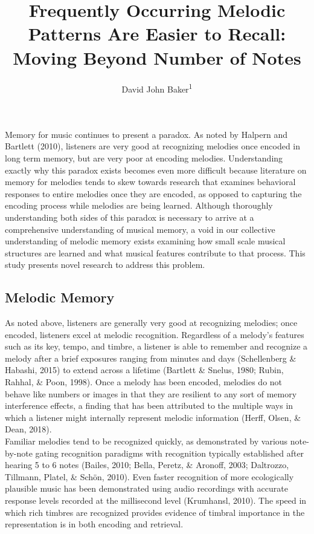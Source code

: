 \documentclass[english,man]{apa6}
\title{Frequently Occurring Melodic Patterns Are Easier to Recall: Moving Beyond Number of Notes}
\author{David John Baker\textsuperscript{1}}
\date{}
\affiliation{\vspace{0.5cm}\textsuperscript{1} Department of Computing, Goldsmiths, University of London}
\begin{document}
\maketitle

Memory for music continues to present a paradox.
As noted by Halpern and Bartlett (2010), listeners are very good at recognizing melodies once encoded in long term memory, but are very poor at encoding melodies.
Understanding exactly why this paradox exists becomes even more difficult because literature on memory for melodies tends to skew towards research that examines behavioral responses to entire melodies once they are encoded, as opposed to capturing the encoding process while melodies are being learned.
Although thoroughly understanding both sides of this paradox is necessary to arrive at a comprehensive understanding of musical memory, a void in our collective understanding of melodic memory exists examining how small scale musical structures are learned and what musical features contribute to that process.
This study presents novel research to address this problem.

\hypertarget{melodic-memory}{%
\subsection{Melodic Memory}\label{melodic-memory}}

As noted above, listeners are generally very good at recognizing melodies; once encoded, listeners excel at melodic recognition.
Regardless of a melody's features such as its key, tempo, and timbre, a listener is able to remember and recognize a melody after a brief exposures ranging from minutes and days (Schellenberg \& Habashi, 2015) to extend across a lifetime (Bartlett \& Snelus, 1980; Rubin, Rahhal, \& Poon, 1998).
Once a melody has been encoded, melodies do not behave like numbers or images in that they are resilient to any sort of memory interference effects, a finding that has been attributed to the multiple ways in which a listener might internally represent melodic information (Herff, Olsen, \& Dean, 2018).\\
Familiar melodies tend to be recognized quickly, as demonstrated by various note-by-note gating recognition paradigms with recognition typically established after hearing 5 to 6 notes (Bailes, 2010; Bella, Peretz, \& Aronoff, 2003; Daltrozzo, Tillmann, Platel, \& Schön, 2010).
Even faster recognition of more ecologically plausible music has been demonstrated using audio recordings with accurate response levels recorded at the millisecond level (Krumhansl, 2010).
The speed in which rich timbres are recognized provides evidence of timbral importance in the representation is in both encoding and retrieval.
\end{document}
